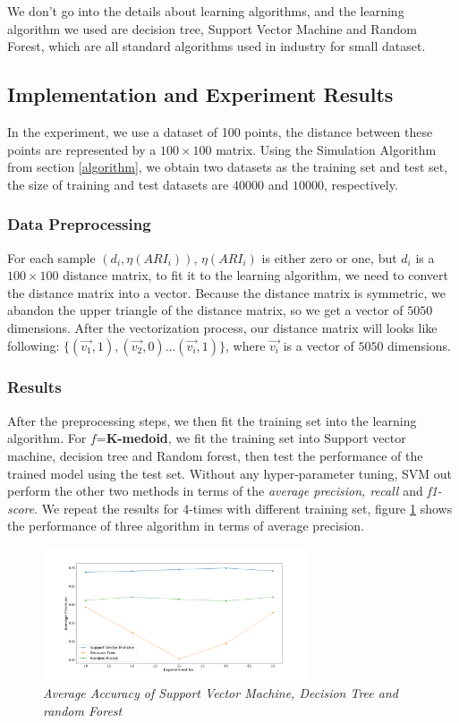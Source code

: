 \documentclass{uonmathreport}
\begin{document}
We don't go into the details about learning algorithms, and the learning algorithm we used are decision tree, Support Vector Machine and Random Forest, which are all standard algorithms used in industry for small dataset.

\subsection{Implementation and Experiment Results} 
In the experiment, we use a dataset of 100 points, the distance between these points are represented by a $100\times100$ matrix. Using the Simulation Algorithm from section \ref{algorithm}, we obtain two datasets as the training set and test set, the size of training and test datasets are $40000$ and $10000$, respectively.
\subsubsection{Data Preprocessing} 
\label{subsec:Experiment}
For each sample $(d_i,\eta(ARI_i))$, $\eta(ARI_i)$ is either zero or one,  but $d_i$ is a $100\times100$ distance matrix, to fit it to the learning algorithm, we need to convert the distance matrix into a vector. Because the distance matrix is symmetric, we abandon the upper triangle of the distance matrix, so we get a vector of $5050$ dimensions. After the vectorization process, our distance matrix will looks like following: $\{(\vec{v_1},1),(\vec{v_2},0)\ldots (\vec{v_i},1)\}$, where $\vec{v_i}$ is a vector of $5050$ dimensions. 
\subsubsection{Results} 
After the preprocessing steps, we then fit the training set into the learning algorithm. For $f$=\textbf{K-medoid}, we fit the training set into Support vector machine, decision tree and Random forest, then test the performance of the trained model using the test set. Without any hyper-parameter tuning, SVM out perform the other two methods in terms of the \textit{average precision, recall} and \textit{f1-score}. We repeat the results for 4-times with different training set, figure \ref{fig:machine-learning} shows the performance of three algorithm in terms of average precision.

\begin{figure}[H]
 \begin{center}
   \includegraphics[width=0.7\textwidth]{posterDiscussion.png}
 \end{center}
 \caption{\textit{Average Accuracy of Support Vector Machine, Decision Tree and random Forest}}
 \label{fig:machine-learning}
\end{figure}
\end{document}

